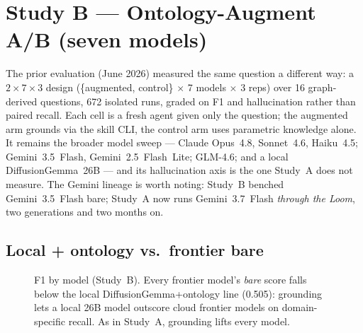 \documentclass[11pt]{article}
\begin{document}
\section{Study B --- Ontology-Augment A/B (seven models)}
The prior evaluation (June 2026) measured the same question a different way: a
$2\times7\times3$ design (\{augmented, control\} $\times$ 7 models $\times$ 3 reps) over 16
graph-derived questions, 672 isolated runs, graded on F1 and hallucination rather than paired
recall. Each cell is a fresh agent given only the question; the augmented arm grounds via the
skill CLI, the control arm uses parametric knowledge alone. It remains the broader model sweep ---
Claude Opus~4.8, Sonnet~4.6, Haiku~4.5; Gemini~3.5~Flash, Gemini~2.5~Flash~Lite; GLM-4.6; and a
local DiffusionGemma~26B --- and its hallucination axis is the one Study~A does not measure. The
Gemini lineage is worth noting: Study~B benched Gemini~3.5~Flash bare; Study~A now runs
Gemini~3.7~Flash \emph{through the Loom}, two generations and two months on.

\subsection{Local + ontology vs.\ frontier bare}
\begin{figure}[H]\centering
{}
\caption{F1 by model (Study~B). Every frontier model's \emph{bare} score falls below the local
DiffusionGemma+ontology line (0.505): grounding lets a local 26B model outscore cloud frontier
models on domain-specific recall. As in Study~A, grounding lifts every model.}
\end{figure}
\end{document}
